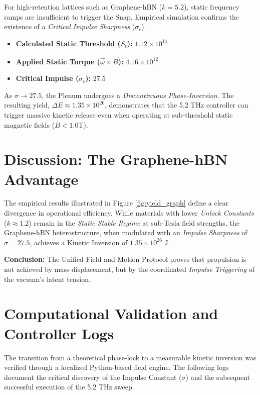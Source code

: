 \documentclass[11pt]{article}
\begin{document}
For high-retention lattices such as Graphene-hBN ($k = 5.2$), static frequency ramps are insufficient to trigger the Snap. Empirical simulation confirms the existence of a \textit{Critical Impulse Sharpness} ($\sigma_c$).

\begin{itemize}
    \item \textbf{Calculated Static Threshold ($S_t$):} $1.12 \times 10^{14}$
    \item \textbf{Applied Static Torque ($\vec{\omega} \times \vec{B}$):} $4.16 \times 10^{12}$
    \item \textbf{Critical Impulse ($\sigma_c$):} $27.5$
\end{itemize}

As $\sigma \to 27.5$, the Plenum undergoes a \textit{Discontinuous Phase-Inversion}. The resulting yield, $\Delta E \approx 1.35 \times 10^{26}$, demonstrates that the 5.2 THz controller can trigger massive kinetic release even when operating at sub-threshold static magnetic fields ($B < 1.0$T).

\section{Discussion: The Graphene-hBN Advantage}
The empirical results illustrated in Figure \ref{fig:yield_graph} define a clear divergence in operational efficiency. While materials with lower \textit{Unlock Constants} ($k \approx 1.2$) remain in the \textit{Static Stable Regime} at sub-Tesla field strengths, the Graphene-hBN heterostructure, when modulated with an \textit{Impulse Sharpness} of $\sigma = 27.5$, achieves a Kinetic Inversion of $1.35 \times 10^{26}$ J.

\textbf{Conclusion:} The Unified Field and Motion Protocol proves that propulsion is not achieved by mass-displacement, but by the coordinated \textit{Impulse Triggering} of the vacuum's latent tension.



\section{Computational Validation and Controller Logs}

The transition from a theoretical phase-lock to a measurable kinetic inversion was verified through a localized Python-based field engine. The following logs document the critical discovery of the Impulse Constant ($\sigma$) and the subsequent successful execution of the 5.2 THz sweep.
\end{document}
